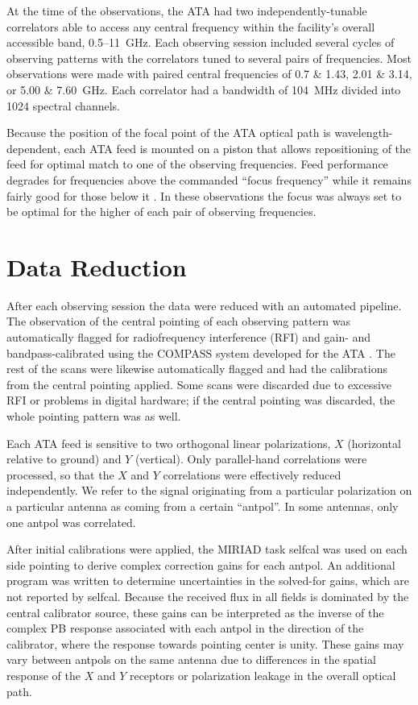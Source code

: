 \documentclass[preprint]{aastex}
\begin{document}
At the time of the observations, the ATA had two independently-tunable
correlators able to access any central frequency within the facility's
overall accessible band, 0.5--11~GHz. Each observing session included
several cycles of observing patterns with the correlators tuned to
several pairs of frequencies. Most observations were made with paired
central frequencies of 0.7 \& 1.43, 2.01 \& 3.14, or 5.00 \&
7.60~GHz. Each correlator had a bandwidth of 104~MHz divided into 1024
spectral channels.

Because the position of the focal point of the ATA optical path is
wavelength-dependent, each ATA feed is mounted on a piston that allows
repositioning of the feed for optimal match to one of the observing
frequencies. Feed performance degrades for frequencies above the
commanded ``focus frequency'' while it remains fairly good for those
below it \citep{Harp2011}. In these observations the focus was always
set to be optimal for the higher of each pair of observing
frequencies.

\section{Data Reduction}\label{s.reduction}

After each observing session the data were reduced with an automated
pipeline. The observation of the central pointing of each observing
pattern was automatically flagged for radiofrequency interference
(RFI) and gain- and bandpass-calibrated using the COMPASS system
developed for the ATA \citep{Keating2010}. The rest of the scans were
likewise automatically flagged and had the calibrations from the
central pointing applied. Some scans were discarded due to excessive
RFI or problems in digital hardware; if the central pointing was
discarded, the whole pointing pattern was as well.

Each ATA feed is sensitive to two orthogonal linear polarizations, $X$
(horizontal relative to ground) and $Y$ (vertical). Only parallel-hand
correlations were processed, so that the $X$ and $Y$ correlations were
effectively reduced independently. We refer to the signal originating
from a particular polarization on a particular antenna as coming from
a certain ``antpol''. In some antennas, only one antpol was
correlated.

After initial calibrations were applied, the MIRIAD \citep{Sault1995}
task \textsf{selfcal} was used on each side pointing to derive complex
correction gains for each antpol. An additional program was written to
determine uncertainties in the solved-for gains, which are not
reported by \textsf{selfcal}. Because the received flux in all fields
is dominated by the central calibrator source, these gains can be
interpreted as the inverse of the complex PB response associated with
each antpol in the direction of the calibrator, where the response
towards pointing center is unity. These gains may vary between antpols
on the same antenna due to differences in the spatial response of the
$X$ and $Y$ receptors or polarization leakage in the overall optical
path.
\end{document}
